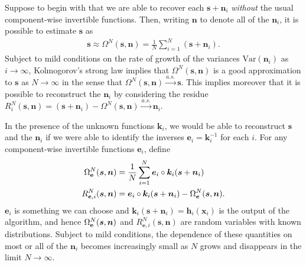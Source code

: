 Suppose to begin with that we are able to recover each $\bm{s} + \bm{n}_i$ \emph{without} the usual component-wise invertible functions. Then, writing $\bm{n}$ to denote all of the $\bm{n}_i$, it is possible to estimate $\bm{s}$ as
\begin{align*}
\bm{s} \approx \Omega^N(\bm{s}, \bm{n}) = \frac{1}{N}\sum_{i=1}^N \left(\bm{s} + \bm{n}_i\right).
\end{align*}
Subject to mild conditions on the rate of growth of the variances $\text{Var}(\bm{n}_i)$ as $i\to\infty$, Kolmogorov's strong law implies that $\Omega^N(\bm{s}, \bm{n})$ is a good approximation to $\bm{s}$ as $N\to\infty$ in the sense that  $\Omega^N(\bm{s}, \bm{n}) \overset{a.s.}{\longrightarrow} \bm{s}$.
This implies moreover that it is possible to reconstruct the $\bm{n}_i$ by considering the residue $R^N_i(\bm{s}, \bm{n}) = (\bm{s} + \bm{n}_i) - \Omega^N(\bm{s}, \bm{n}) \overset{a.s.}{\longrightarrow} \bm{n}_i$.

In the presence of the unknown functions $\bm{k}_i$, we would be able to reconstruct $\bm{s}$ and the $\bm{n}_i$ if we were able to identify the inverses $\bm{e}_i = \bm{k}_i^{-1}$ for each $i$.
For any component-wise invertible functions $\bm{e}_i$, define
\begin{align*}
\Omega_{\mathbf{e}}^N(\bm{s}, \bm{n}) &= \frac{1}{N} \sum_{i=1}^N \bm{e}_i\circ \bm{k}_i( \bm{s} + \bm{n}_i) \\
R_{\bm{e}, i}^N(\bm{s}, \bm{n}) &= \bm{e}_i\circ \bm{k}_i( \bm{s} + \bm{n}_i) - \Omega_{\bm{e}}^N(\bm{s}, \bm{n}).\\
\end{align*}
$\bm{e}_i$ is something we can choose and $\bm{k}_i(\bm{s}+\bm{n}_i) = \bm{h}_i(\bm{x}_i)$ is the output of the algorithm, and hence $\Omega_{\mathbf{e}}^N(\bm{s}, \bm{n})$ and $R_{\bm{e}, i}^N(\bm{s}, \bm{n})$ are random variables with known distributions.
Subject to mild conditions, the dependence of these quantities on most or all of the $\bm{n}_i$ becomes increasingly small as $N$ grows and disappears in the limit $N\to\infty$.

\medskip

